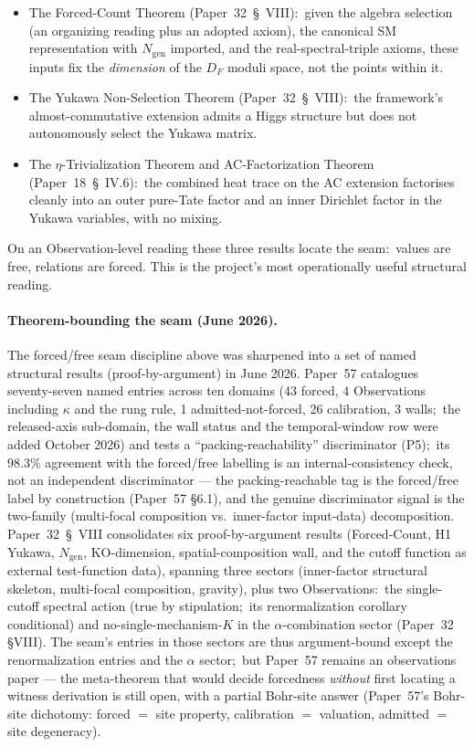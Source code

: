 \documentclass[11pt,a4paper]{article}
\begin{document}
\begin{itemize}
  \item The Forced-Count Theorem (Paper~32~\S~VIII):\ given the
    algebra selection (an organizing reading plus an adopted axiom),
    the canonical SM representation with $N_{\mathrm{gen}}$ imported,
    and the real-spectral-triple axioms, these inputs fix the
    \emph{dimension} of the $D_F$ moduli space, not the points within
    it.
  \item The Yukawa Non-Selection Theorem (Paper~32~\S~VIII):\ the framework's
    almost-commutative extension admits a Higgs structure but does
    not autonomously select the Yukawa matrix.
  \item The $\eta$-Trivialization Theorem and AC-Factorization
    Theorem (Paper~18~\S~IV.6):\ the combined heat trace on the AC
    extension factorises cleanly into an outer pure-Tate factor and
    an inner Dirichlet factor in the Yukawa variables, with no
    mixing.
\end{itemize}

On an Observation-level reading these three results locate the
seam:\ values are free, relations are forced.  This is the
project's most operationally useful structural reading.

\paragraph{Theorem-bounding the seam (June 2026).}  The forced/free seam
discipline above was sharpened into a set of named structural results
(proof-by-argument) in June 2026.  Paper~57
catalogues seventy-seven named entries across ten domains (43 forced, 4
Observations including $\kappa$ and the rung rule, 1 admitted-not-forced, 26 calibration,
3 walls;\ the released-axis sub-domain, the wall status and the
temporal-window row were added October 2026) and tests a
``packing-reachability'' discriminator (P5);\ its $98.3\%$ agreement
with the forced/free labelling is an internal-consistency check, not an
independent discriminator --- the packing-reachable tag is the
forced/free label by construction (Paper~57 \S6.1), and the genuine
discriminator signal is the two-family (multi-focal composition
vs.\ inner-factor input-data) decomposition.  Paper~32~\S~VIII
consolidates six proof-by-argument results (Forced-Count,
H1 Yukawa, $N_{\mathrm{gen}}$, KO-dimension, spatial-composition wall,
and the cutoff function as external test-function data), spanning
three sectors (inner-factor structural skeleton, multi-focal
composition, gravity), plus two Observations:\ the single-cutoff
spectral action (true by stipulation;\ its renormalization corollary
conditional) and no-single-mechanism-$K$ in the $\alpha$-combination
sector (Paper~32 \S VIII).  The seam's entries in those sectors are
thus argument-bound except the renormalization entries and the
$\alpha$ sector;\ but Paper~57 remains an observations paper --- the
meta-theorem that would decide forcedness \emph{without} first locating
a witness derivation is still open, with a partial Bohr-site answer
(Paper~57's Bohr-site dichotomy: forced $=$ site property, calibration
$=$ valuation, admitted $=$ site degeneracy).
\end{document}
